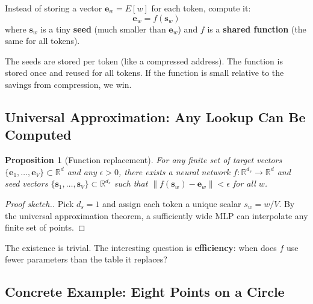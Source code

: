\documentclass[11pt, a4paper]{article}
\newcommand{\s}{\mathbf{s}}
\newcommand{\R}{\mathbb{R}}
\newtheorem{proposition}{Proposition}
\theoremstyle{remark}
\begin{document}
Instead of storing a vector $\mathbf{e}_w = E[w]$ for each token, compute it:
\[
    \mathbf{e}_w = f(\s_w)
\]
where $\s_w$ is a tiny \textbf{seed} (much smaller than $\mathbf{e}_w$) and $f$ is a \textbf{shared function} (the same for all tokens).

The seeds are stored per token (like a compressed address).
The function is stored once and reused for all tokens.
If the function is small relative to the savings from compression, we win.

\subsection{Universal Approximation: Any Lookup Can Be Computed}

\begin{proposition}[Function replacement]
For any finite set of target vectors $\{\mathbf{e}_1, \ldots, \mathbf{e}_V\} \subset \R^d$ and any $\epsilon > 0$, there exists a neural network $f: \R^{d_s} \to \R^d$ and seed vectors $\{\s_1, \ldots, \s_V\} \subset \R^{d_s}$ such that $\|f(\s_w) - \mathbf{e}_w\| < \epsilon$ for all $w$.
\end{proposition}

\begin{proof}[Proof sketch.]
Pick $d_s = 1$ and assign each token a unique scalar $s_w = w/V$.
By the universal approximation theorem, a sufficiently wide MLP can interpolate any finite set of points.
\end{proof}

The existence is trivial.
The interesting question is \textbf{efficiency}: when does $f$ use fewer parameters than the table it replaces?

\subsection{Concrete Example: Eight Points on a Circle}
\end{document}

